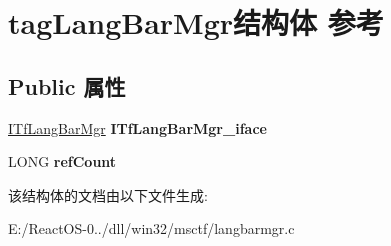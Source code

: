 \hypertarget{structtag_lang_bar_mgr}{}\section{tag\+Lang\+Bar\+Mgr结构体 参考}
\label{structtag_lang_bar_mgr}
\subsection*{Public 属性}
\begin{DoxyCompactItemize}
\item 
\mbox{\label{structtag_lang_bar_mgr_a154eaa33a2524312f209f506cf0a0600}} 
\hyperlink{interface_i_tf_lang_bar_mgr}{I\+Tf\+Lang\+Bar\+Mgr} {\bfseries I\+Tf\+Lang\+Bar\+Mgr\+\_\+iface}
\item 
\mbox{\label{structtag_lang_bar_mgr_a00a48b68713b6b5bcaa51825d98cbd36}} 
L\+O\+NG {\bfseries ref\+Count}
\end{DoxyCompactItemize}


该结构体的文档由以下文件生成\+:\begin{DoxyCompactItemize}
\item 
E\+:/\+React\+O\+S-\/0../dll/win32/msctf/langbarmgr.\+c\end{DoxyCompactItemize}
